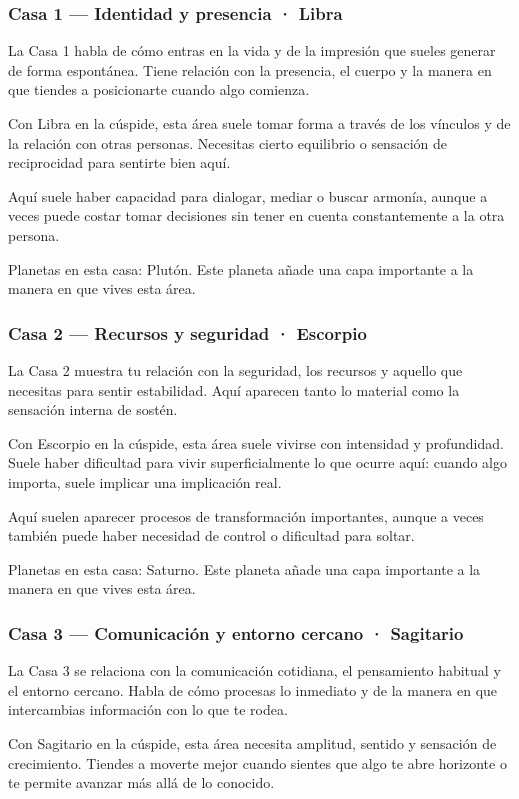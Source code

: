 \documentclass[11pt,a4paper]{article}
\begin{document}
\subsubsection*{Casa 1 — Identidad y presencia · Libra}
La Casa 1 habla de cómo entras en la vida y de la impresión que sueles generar de forma espontánea. Tiene relación con la presencia, el cuerpo y la manera en que tiendes a posicionarte cuando algo comienza.

Con Libra en la cúspide, esta área suele tomar forma a través de los vínculos y de la relación con otras personas. Necesitas cierto equilibrio o sensación de reciprocidad para sentirte bien aquí.

Aquí suele haber capacidad para dialogar, mediar o buscar armonía, aunque a veces puede costar tomar decisiones sin tener en cuenta constantemente a la otra persona.

Planetas en esta casa: Plutón. Este planeta añade una capa importante a la manera en que vives esta área.

\subsubsection*{Casa 2 — Recursos y seguridad · Escorpio}
La Casa 2 muestra tu relación con la seguridad, los recursos y aquello que necesitas para sentir estabilidad. Aquí aparecen tanto lo material como la sensación interna de sostén.

Con Escorpio en la cúspide, esta área suele vivirse con intensidad y profundidad. Suele haber dificultad para vivir superficialmente lo que ocurre aquí: cuando algo importa, suele implicar una implicación real.

Aquí suelen aparecer procesos de transformación importantes, aunque a veces también puede haber necesidad de control o dificultad para soltar.

Planetas en esta casa: Saturno. Este planeta añade una capa importante a la manera en que vives esta área.

\subsubsection*{Casa 3 — Comunicación y entorno cercano · Sagitario}
La Casa 3 se relaciona con la comunicación cotidiana, el pensamiento habitual y el entorno cercano. Habla de cómo procesas lo inmediato y de la manera en que intercambias información con lo que te rodea.

Con Sagitario en la cúspide, esta área necesita amplitud, sentido y sensación de crecimiento. Tiendes a moverte mejor cuando sientes que algo te abre horizonte o te permite avanzar más allá de lo conocido.
\end{document}

